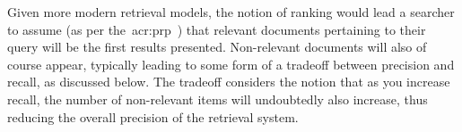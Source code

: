 Given more modern retrieval models, the notion of ranking would lead a searcher to assume (as per the~\gls{acr:prp}~\citep{robertson1977prp}) that relevant documents pertaining to their query will be the first results presented. Non-relevant documents will also of course appear, typically leading to some form of a tradeoff between precision and recall, as discussed below. The tradeoff considers the notion that as you increase recall, the number of non-relevant items will undoubtedly also increase, thus reducing the overall precision of the retrieval system.

%
%
%
